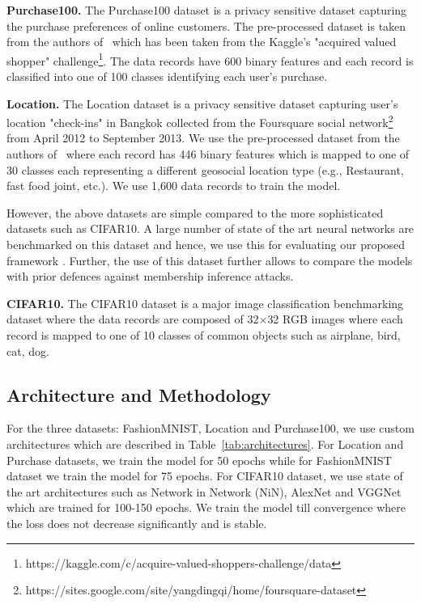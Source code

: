 \noindent\textbf{Purchase100.} The  Purchase100  dataset  is a privacy sensitive dataset capturing the purchase preferences of online customers.
The pre-processed dataset is taken from the authors of~\cite{} which has been taken from the Kaggle's "acquired valued shopper" challenge\footnote{https://kaggle.com/c/acquire-valued-shoppers-challenge/data}.
The data records have 600 binary features and each record is classified into one of 100 classes identifying each user's purchase.

\noindent\textbf{Location.} The Location dataset is a privacy sensitive dataset capturing user's location "check-ins" in Bangkok collected from the Foursquare social network\footnote{https://sites.google.com/site/yangdingqi/home/foursquare-dataset} from April 2012 to September 2013.
We use the pre-processed dataset from the authors of~\cite{} where each record has 446 binary features which is mapped to one of 30 classes each representing a different geosocial location type (e.g., Restaurant, fast food joint, etc.). We use 1,600 data records to train the model.

However, the above datasets are simple compared to the more sophisticated datasets such as CIFAR10.
A large number of state of the art neural networks are benchmarked on this dataset and hence, we use this for evaluating our proposed framework \method\hspace{0.02in}.
Further, the use of this dataset further allows to compare the models with prior defences against membership inference attacks.

\noindent\textbf{CIFAR10.} The CIFAR10 dataset is a major image classification benchmarking dataset where the data records are composed of 32$\times$32 RGB images where each record is mapped to one of 10 classes of common objects such as airplane, bird, cat, dog.


\subsection{Architecture and Methodology}

For the three datasets: FashionMNIST, Location and Purchase100, we use custom architectures which are described in Table~\ref{tab:architectures}.
For Location and Purchase datasets, we train the model for 50 epochs while for FashionMNIST dataset we train the model for 75 epochs.
For CIFAR10 dataset, we use state of the art architectures such as Network in Network (NiN), AlexNet and VGGNet which are trained for 100-150 epochs.
We train the model till convergence where the loss does not decrease significantly and is stable.

